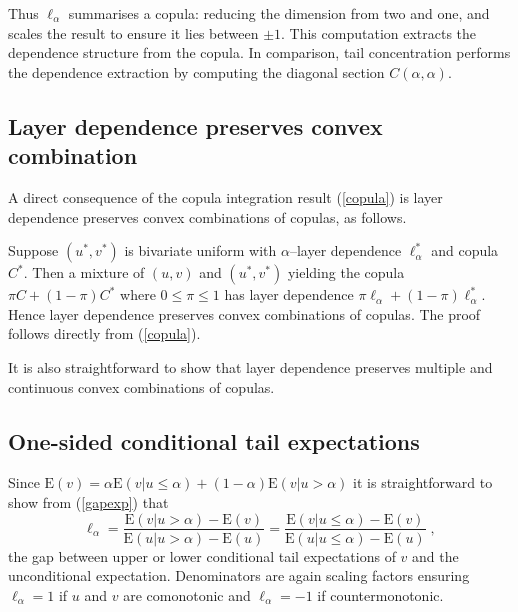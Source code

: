 \documentclass[authoryear]{elsarticle}
\newcommand{\E}{{\mathrm E}}
\newcommand{\eref}[1]{(\ref{#1})}
\begin{document}
Thus $\ell_\alpha$ summarises a copula: reducing the dimension from two and one, and scales the result to ensure it lies between $\pm 1$. This computation extracts the dependence structure from the copula. In comparison, tail concentration performs the dependence extraction by computing the diagonal section $C(\alpha,\alpha)$.

\subsection{Layer dependence preserves convex combination}

A direct consequence of the copula integration result \eref{copula} is layer dependence preserves convex combinations of copulas, as follows.

Suppose $(u^*,v^*)$ is bivariate uniform with $\alpha$--layer dependence $\ell_\alpha^*$ and copula $C^*$. Then a mixture of $(u,v)$ and $(u^*,v^*)$ yielding the copula $\pi C+(1-\pi)C^*$ where $0\le \pi\le 1$ has layer dependence $\pi\ell_\alpha+(1-\pi)\ell_\alpha^*$. Hence layer dependence preserves convex combinations of copulas. The proof follows directly from \eref{copula}.

It is also straightforward to show that layer dependence preserves multiple and continuous convex combinations of copulas.



\subsection{One-sided conditional tail expectations}


Since $\E(v)=\alpha\E(v|u\leq \alpha)+(1-\alpha)\E(v|u>\alpha)$ it is straightforward to show from \eref{gapexp} that
$$
\ell_\alpha = \frac{\E(v|u> \alpha)-\E(v)}{\E(u|u> \alpha)-\E(u)} = \frac{\E(v|u\leq \alpha)-\E(v)}{\E(u|u\leq \alpha)-\E(u)} \;,
$$
the gap between upper or lower conditional tail expectations of $v$ and the unconditional expectation. Denominators are again scaling factors ensuring $\ell_\alpha=1$ if $u$ and $v$ are comonotonic and $\ell_\alpha=-1$ if countermonotonic.
\end{document}
